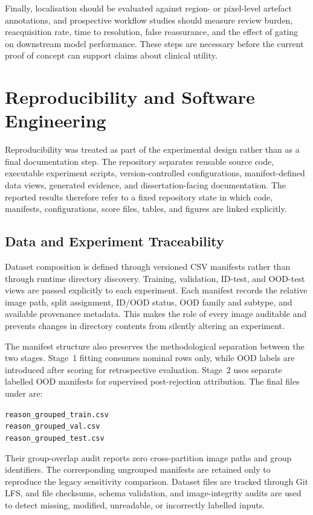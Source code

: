 \documentclass[fleqn,12pt]{olplainarticle}
\begin{document}
Finally, localisation should be evaluated against region- or pixel-level
artefact annotations, and prospective workflow studies should measure review
burden, reacquisition rate, time to resolution, false reassurance, and the
effect of gating on downstream model performance. These steps are necessary
before the current proof of concept can support claims about clinical utility.



\newpage
\section{Reproducibility and Software Engineering}
\label{sec:reproducibility}

Reproducibility was treated as part of the experimental design rather than as
a final documentation step. The repository separates reusable source code,
executable experiment scripts, version-controlled configurations,
manifest-defined data views, generated evidence, and dissertation-facing
documentation. The reported results therefore refer to a fixed repository
state in which code, manifests, configurations, score files, tables, and
figures are linked explicitly.

\subsection{Data and Experiment Traceability}
\label{subsec:reproducibility_traceability}

Dataset composition is defined through versioned CSV manifests rather than
through runtime directory discovery. Training, validation, ID-test, and
OOD-test views are passed explicitly to each experiment. Each manifest records
the relative image path, split assignment, ID/OOD status, OOD family and
subtype, and available provenance metadata. This makes the role of every
image auditable and prevents changes in directory contents from silently
altering an experiment.

The manifest structure also preserves the methodological separation between
the two stages. Stage~1 fitting consumes nominal rows only, while OOD labels
are introduced after scoring for retrospective evaluation. Stage~2 uses
separate labelled OOD manifests for supervised post-rejection attribution.
The final files under  are:
\begin{center}
    \small
    \texttt{reason\_grouped\_train.csv}\\
    \texttt{reason\_grouped\_val.csv}\\
    \texttt{reason\_grouped\_test.csv}
\end{center}
Their group-overlap audit reports zero cross-partition image paths and group
identifiers. The corresponding ungrouped manifests are retained only to
reproduce the legacy sensitivity comparison.
Dataset files are tracked through Git LFS, and file checksums, schema
validation, and image-integrity audits are used to detect missing, modified,
unreadable, or incorrectly labelled inputs.
\end{document}
